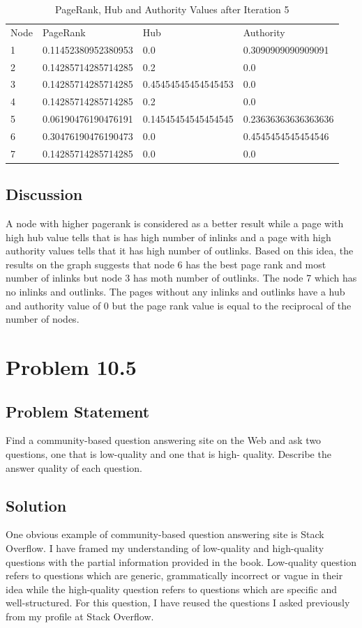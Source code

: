 \documentclass[12pt]{report}
\begin{document}
\begin{table}[]
\centering
\caption{PageRank, Hub and Authority Values after Iteration 5}
\label{my-label}
\begin{tabular}{llll}
Node & PageRank            & Hub                 & Authority           \\
1    & 0.11452380952380953 & 0.0                 & 0.3090909090909091  \\
2    & 0.14285714285714285 & 0.2                 & 0.0                 \\
3    & 0.14285714285714285 & 0.45454545454545453 & 0.0                 \\
4    & 0.14285714285714285 & 0.2                 & 0.0                 \\
5    & 0.06190476190476191 & 0.14545454545454545 & 0.23636363636363636 \\
6    & 0.30476190476190473 & 0.0                 & 0.4545454545454546  \\
7    & 0.14285714285714285 & 0.0                 & 0.0                
\end{tabular}
\end{table}

\section{Discussion}
A node with higher pagerank  is considered as a better result while a page with high hub value tells that is has high number of inlinks and a page with high authority values tells that it has high number of outlinks. Based on this idea, the results on the graph suggests that node 6 has the best page rank and most number of inlinks but node 3 has moth number of outlinks. The node 7 which has no inlinks and outlinks. The pages without any inlinks and outlinks have a hub and authority value of 0 but the page rank value is equal to the reciprocal of the number of nodes. 

\chapter{Problem 10.5}
\section{Problem Statement}
Find a community-based question answering site on the Web and ask two questions, one that is low-quality and one that is high- quality. Describe the answer quality of each question.
\section{Solution}
One obvious example of community-based question answering site is Stack Overflow. I have framed my understanding of low-quality and high-quality questions with the partial information provided in the book. Low-quality question refers to questions which are generic, grammatically incorrect or vague in their idea while the high-quality question refers to questions which are specific and well-structured. For this question, I have reused the questions I asked previously from my profile at Stack Overflow.
\end{document}
